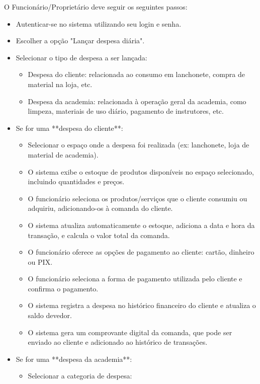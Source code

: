 O Funcionário/Proprietário deve seguir os seguintes passos:
\begin{itemize}
    \item Autenticar-se no sistema utilizando seu login e senha.
    \item Escolher a opção "Lançar despesa diária".
    \item Selecionar o tipo de despesa a ser lançada:
    \begin{itemize}
        \item Despesa do cliente: relacionada ao consumo em lanchonete, compra de material na loja, etc.
        \item Despesa da academia: relacionada à operação geral da academia, como limpeza, materiais de uso diário, pagamento de instrutores, etc.
    \end{itemize}
    \item Se for uma **despesa do cliente**:
    \begin{itemize}
        \item Selecionar o espaço onde a despesa foi realizada (ex: lanchonete, loja de material de academia).
        \item O sistema exibe o estoque de produtos disponíveis no espaço selecionado, incluindo quantidades e preços.
        \item O funcionário seleciona os produtos/serviços que o cliente consumiu ou adquiriu, adicionando-os à comanda do cliente.
        \item O sistema atualiza automaticamente o estoque, adiciona a data e hora da transação, e calcula o valor total da comanda.
        \item O funcionário oferece as opções de pagamento ao cliente: cartão, dinheiro ou PIX.
        \item O funcionário seleciona a forma de pagamento utilizada pelo cliente e confirma o pagamento.
        \item O sistema registra a despesa no histórico financeiro do cliente e atualiza o saldo devedor.
        \item O sistema gera um comprovante digital da comanda, que pode ser enviado ao cliente e adicionado ao histórico de transações.
    \end{itemize}
    \item Se for uma **despesa da academia**:
    \begin{itemize}
        \item Selecionar a categoria de despesa:
        \begin{itemize}

\end{itemize}
\end{itemize}
\end{itemize}
